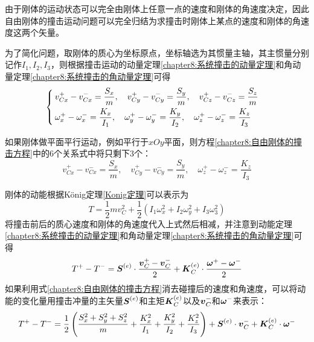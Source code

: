 由于刚体的运动状态可以完全由刚体上任意一点的速度和刚体的角速度决定，因此自由刚体的撞击运动问题可以完全归结为求撞击时刚体上某点的速度和刚体的角速度这两个矢量。

为了简化问题，取刚体的质心为坐标原点，坐标轴选为其惯量主轴，其主惯量分别记作$I_1, I_2, I_3$，则根据撞击运动的动量定理\eqref{chapter8:系统撞击的动量定理}和角动量定理\eqref{chapter8:系统撞击的角动量定理}可得
\begin{equation}
\begin{cases}
	\displaystyle v_{Cx}^+-v_{Cx}^- = \frac{S_x}{m},\quad v_{Cy}^+-v_{Cy}^- = \frac{S_y}{m},\quad v_{Cz}^+-v_{Cz}^- = \frac{S_z}{m} \\[1.5ex]
	\displaystyle \omega_x^+-\omega_x^- = \frac{K_x}{I_1},\quad \omega_y^+-\omega_y^- = \frac{K_y}{I_2},\quad \omega_z^+-\omega_z^- = \frac{K_z}{I_3}
\end{cases}
\label{chapter8:自由刚体的撞击方程}
\end{equation}

如果刚体做平面平行运动，例如平行于$xOy$平面，则方程\eqref{chapter8:自由刚体的撞击方程}中的6个关系式中将只剩下3个：
\begin{equation}
	v_{Cx}^+-v_{Cx}^- = \frac{S_x}{m},\quad v_{Cy}^+-v_{Cy}^- = \frac{S_y}{m},\quad \omega_z^+-\omega_z^- = \frac{K_z}{I_3}
	\label{chapter8:自由刚体的平面平行运动撞击方程}
\end{equation}

刚体的动能根据K\"onig定理\eqref{Konig定理}可以表示为
\begin{equation*}
	T = \frac12 mv_C^2 + \frac12 \left(I_1\omega_x^2+I_2\omega_y^2+I_3\omega_3^2\right)
\end{equation*}
将撞击前后的质心速度和刚体的角速度代入上式然后相减，并注意到动能定理\eqref{chapter8:系统撞击的动量定理}和角动量定理\eqref{chapter8:系统撞击的角动量定理}可得
\begin{equation}
	T^+-T^- = \boldsymbol{S}^{(e)}\cdot \frac{\boldsymbol{v}_C^+-\boldsymbol{v}_C^-}{2} + \boldsymbol{K}_C^{(e)}\cdot \frac{\boldsymbol{\omega}^+-\boldsymbol{\omega}^-}{2}
\end{equation}
如果利用式\eqref{chapter8:自由刚体的撞击方程}消去碰撞后的速度和角速度，可以将动能的变化量用撞击冲量的主矢量$\boldsymbol{S}^{(e)}$和主矩$\boldsymbol{K}_C^{(e)}$以及$\boldsymbol{v}_C^-$和$\boldsymbol{\omega}^-$来表示：
\begin{equation}
	T^+-T^- = \frac12\left(\frac{S_x^2+S_y^2+S_z^2}{m}+\frac{K_x^2}{I_1}+\frac{K_y^2}{I_2}+\frac{K_z^2}{I_3}\right) + \boldsymbol{S}^{(e)}\cdot\boldsymbol{v}_C^- + \boldsymbol{K}_C^{(e)}\cdot\boldsymbol{\omega}^-
\end{equation}

